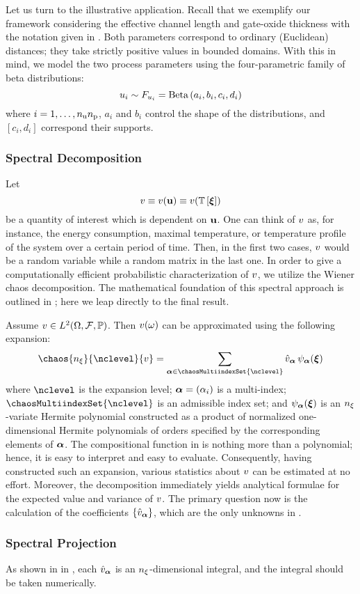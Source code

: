 Let us turn to the illustrative application.
Recall that we exemplify our framework considering the effective channel length and gate-oxide thickness with the notation given in .
Both parameters correspond to ordinary (Euclidean) distances; they take strictly positive values in bounded domains.
With this in mind, we model the two process parameters using the four-parametric family of beta distributions:
\begin{equation*}
  u_i \sim F_{u_i} = \text{Beta}\left( a_i, b_i, c_i, d_i \right)
\end{equation*}
where $i = 1, \dots, {n_\text{u}} {n_\text{p}}$, $a_i$ and $b_i$ control the shape of the distributions, and $[ c_i, d_i ]$ correspond their supports.

\subsubsection{Spectral Decomposition}
Let
\[
  \w \equiv \w(\vu) \equiv \w(\transformation{\vz})
\]
be a quantity of interest which is dependent on $\mathbf{u}$.
One can think of $v$ as, for instance, the energy consumption, maximal temperature, or temperature profile of the system over a certain period of time.
Then, in the first two cases, $v$ would be a random variable while a random matrix in the last one.
In order to give a computationally efficient probabilistic characterization of $v$, we utilize the Wiener chaos decomposition.
The mathematical foundation of this spectral approach is outlined in ; here we leap directly to the final result.

Assume $v \in L^{2}(\Omega, \mathcal{F}, \mathbb{P})$.
Then $v(\omega)$ can be approximated using the following expansion:
\begin{equation} \elab{spectral-decomposition}
  \chaos{\nvars}{\nclevel}{\w} = \sum_{\multiindex \in \chaosMultiindexSet{\nclevel}} \coefficient{\w}_{\multiindex} \, \polynomial_{\multiindex}(\vz)
\end{equation}
where $\nclevel$ is the expansion level; $\bm{\alpha} = (\alpha_i)$ is a multi-index; $\chaosMultiindexSet{\nclevel}$ is an admissible index set; and $\psi_{\bm{\alpha}}(\bm{\xi})$ is an ${n_\xi}$-variate Hermite polynomial constructed as a product of normalized one-dimensional Hermite polynomials of orders specified by the corresponding elements of $\bm{\alpha}$.
The compositional function in  is nothing more than a polynomial; hence, it is easy to interpret and easy to evaluate.
Consequently, having constructed such an expansion, various statistics about $v$ can be estimated at no effort.
Moreover, the decomposition immediately yields analytical formulae for the expected value and variance of $v$.
The primary question now is the calculation of the coefficients $\{ \hat{v}_{\bm{\alpha}} \}$, which are the only unknowns in .

\subsubsection{Spectral Projection}
As shown in  in , each $\hat{v}_{\bm{\alpha}}$ is an ${n_\xi}$-dimensional integral, and the integral should be taken numerically.
